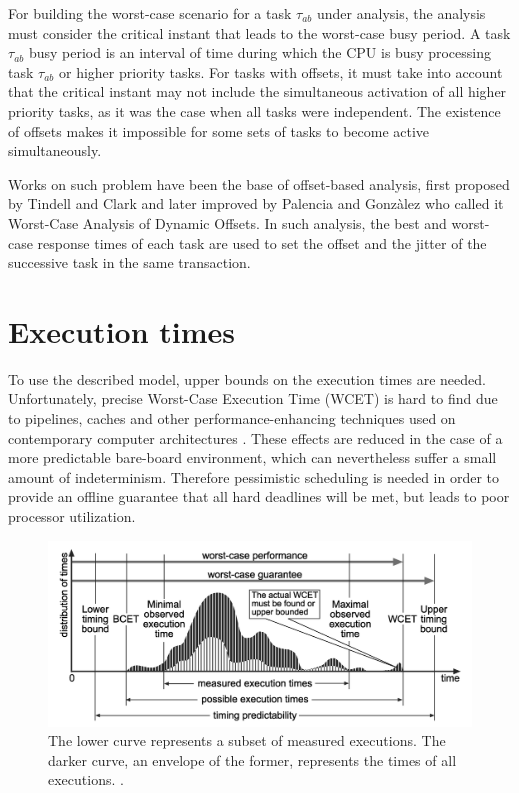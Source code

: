 \documentclass{article}
\begin{document}
For building the worst-case scenario for a task $\tau_{ab}$ under analysis, the analysis must consider the critical instant that leads to the worst-case busy period. A task $\tau_{ab}$ busy period is an interval of time during which the CPU is busy processing task $\tau_{ab}$ or higher priority tasks. For tasks with offsets, it must take into account that the critical instant may not include the simultaneous activation of all higher priority tasks, as it was the case when all tasks were independent. The existence of offsets makes it impossible for some sets of tasks to become active simultaneously.

Works on such problem have been the base of offset-based analysis, first proposed by Tindell and Clark \cite{tindell-offsets} and later improved by Palencia and Gonzàlez \cite{pessimistic-rma} who called it Worst-Case Analysis of Dynamic Offsets. In such analysis, the best and worst-case response times of each task are used to set the offset and the jitter of the successive task in the same transaction.

\section{Execution times}

To use the described model, upper bounds on the execution times are needed. Unfortunately, precise Worst-Case Execution Time (WCET) is hard to find due to pipelines, caches and other performance-enhancing techniques used on contemporary computer architectures \cite{wcet-problem}. These effects are reduced in the case of a more predictable bare-board environment, which can nevertheless suffer a small amount of indeterminism. Therefore pessimistic scheduling is needed in order to provide an offline guarantee that all hard deadlines will be met, but leads to poor processor utilization.

\begin{figure}[!htbp]
\centering
\includegraphics[width=5in]{images/wcet}
\caption{The lower curve represents a subset of measured executions. The darker curve, an envelope of the former, represents the times of all executions. \cite{wcet-problem}.}
\label{wcet-curve}
\end{figure}
\end{document}

